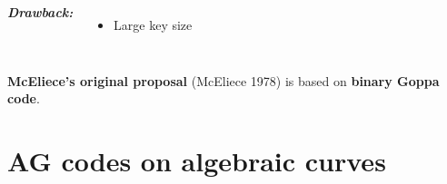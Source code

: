 \documentclass[
10pt, %
%
aspectratio=169, %
]{beamer}
\theoremstyle{plain}%
\theoremstyle{definition}
\theoremstyle{remark}
\newcommand{\calA}{\mathcal{A}}
\newcommand{\calC}{\mathcal{C}}
\begin{document}
\begin{frame}
\begin{columns}[T,onlytextwidth]
			\textcolor{amaranth}{\textbf{\textit{Drawback:}}}
			\begin{itemize}
				\item[\color{amaranth}{\ding{55}}] Large key size
			\end{itemize}
		\end{columns}
		\vspace{0.3em}
		\textcolor{palatinatepurple}{}  \textbf{McEliece's original proposal} (McEliece 1978) is based on \textbf{binary Goppa code}. 
		
	\end{frame}
	\section{AG codes on algebraic curves}
	
\end{document}
